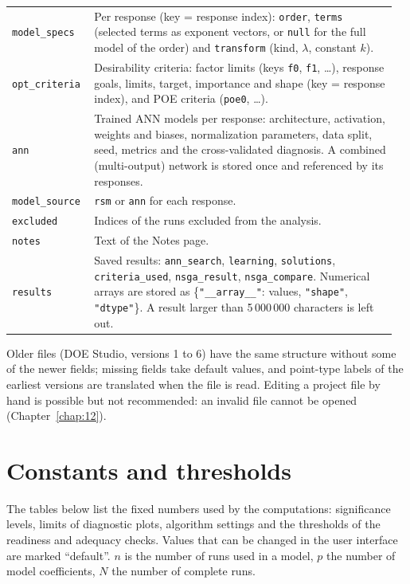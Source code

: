 {\begin{longtable}{@{}p{0.2\linewidth}p{0.76\linewidth}@{}}
\texttt{model\_specs} & Per response (key = response index): \texttt{order}, \texttt{terms} (selected terms as
  exponent vectors, or \texttt{null} for the full model of the order) and \texttt{transform} (kind, $\lambda$,
  constant $k$). \\
\texttt{opt\_criteria} & Desirability criteria: factor limits (keys \texttt{f0}, \texttt{f1}, \dots), response goals,
  limits, target, importance and shape (key = response index), and POE criteria (\texttt{poe0}, \dots). \\
\texttt{ann} & Trained ANN models per response: architecture, activation, weights and biases, normalization
  parameters, data split, seed, metrics and the cross-validated diagnosis. A combined (multi-output) network is
  stored once and referenced by its responses. \\
\texttt{model\_source} & \texttt{rsm} or \texttt{ann} for each response. \\
\texttt{excluded} & Indices of the runs excluded from the analysis. \\
\texttt{notes} & Text of the Notes page. \\
\texttt{results} & Saved results: \texttt{ann\_search}, \texttt{learning}, \texttt{solutions},
  \texttt{criteria\_used}, \texttt{nsga\_result}, \texttt{nsga\_compare}. Numerical arrays are stored as
  \{\texttt{"\_\_array\_\_"}: values, \texttt{"shape"}, \texttt{"dtype"}\}. A result larger than 5\,000\,000
  characters is left out. \\
\end{longtable}}

Older files (DOE Studio, versions 1 to 6) have the same structure without some of the newer fields; missing fields
take default values, and point-type labels of the earliest versions are translated when the file is read. Editing a
project file by hand is possible but not recommended: an invalid file cannot be opened (Chapter~\ref{chap:12}).

\section{Constants and thresholds}
\label{sec:a-constants}

The tables below list the fixed numbers used by the computations: significance levels, limits of diagnostic plots,
algorithm settings and the thresholds of the readiness and adequacy checks. Values that can be changed in the user
interface are marked ``default''. $n$ is the number of runs used in a model, $p$ the number of model coefficients,
$N$ the number of complete runs.


